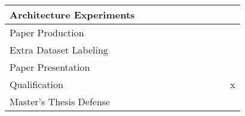 \begin{table}[ht]
\begin{tabular}{lllllllllll}
Architecture Experiments                              &                          &                          &                          &                          &                          & \cellcolor[HTML]{96FFFB} & \cellcolor[HTML]{96FFFB} &                                              &                                              &                          \\ \hline
Paper Production                                      &                          &                          &                          &                          &                          &                          &                          & \cellcolor[HTML]{96FFFB}                     &   \cellcolor[HTML]{96FFFB}                   &                          \\ \hline
Extra Dataset Labeling                                &                          &                          &                          &                          &                          &                          &                          &                                  \cellcolor[HTML]{FFFFC7}             & \cellcolor[HTML]{FFFFC7}                     &     \cellcolor[HTML]{FFFFC7}                     \\ \hline
Paper Presentation                                    &                          &                          &                          &                          &                          &                          &                          &                                              &    \cellcolor[HTML]{FD6864}                  &                          \\ \hline
Qualification                                         &                          &                          &                          &                          &                          &                          & \multicolumn{1}{c}{}     &  &  &       \multicolumn{1}{c}{\cellcolor[HTML]{FD6864}x}                   \\ \hline
Master’s Thesis Defense                               &                          &                          &                          &                          &                          &                          &                          &                                              &                                              & \cellcolor[HTML]{FD6864} \\ \hline

\end{tabular}
\end{table}
